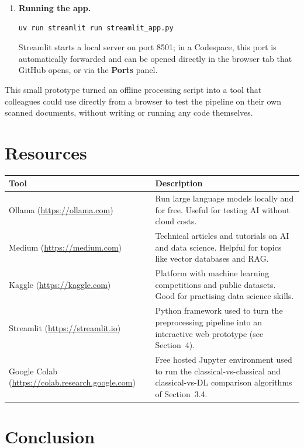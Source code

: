 \documentclass[12pt, a4paper]{article}
\begin{document}
\begin{enumerate}
  \item \textbf{Running the app.}
\begin{lstlisting}
uv run streamlit run streamlit_app.py
\end{lstlisting}
  Streamlit starts a local server on port 8501; in a Codespace, this port is automatically forwarded and can be opened directly in the browser tab that GitHub opens, or via the \textbf{Ports} panel.
\end{enumerate}

This small prototype turned an offline processing script into a tool that colleagues could use directly from a browser to test the pipeline on their own scanned documents, without writing or running any code themselves.

\section{\color{navyblue} Resources}

\vspace{0.5em}
\begin{tabularx}{\textwidth}{lX}
\toprule
\textbf{Tool} & \textbf{Description} \\
\midrule
Ollama (\url{https://ollama.com}) & Run large language models locally and for free. Useful for testing AI without cloud costs. \\
\addlinespace
Medium (\url{https://medium.com}) & Technical articles and tutorials on AI and data science. Helpful for topics like vector databases and RAG. \\
\addlinespace
Kaggle (\url{https://kaggle.com}) & Platform with machine learning competitions and public datasets. Good for practising data science skills. \\
\addlinespace
Streamlit (\url{https://streamlit.io}) & Python framework used to turn the preprocessing pipeline into an interactive web prototype (see Section~4). \\
\addlinespace
Google Colab (\url{https://colab.research.google.com}) & Free hosted Jupyter environment used to run the classical-vs-classical and classical-vs-DL comparison algorithms of Section~3.4. \\
\bottomrule
\end{tabularx}

\newpage
\section*{\color{navyblue} Conclusion}
\end{document}
